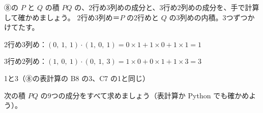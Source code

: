 \begin{reidai}[3×3 の積]
⑧の $P$ と $Q$ の積 $PQ$ の、2行め3列めの成分と、3行め2列めの成分を、手で計算して確かめましょう。
\kangaekata 2行め3列め＝$P$ の2行めと $Q$ の3列めの内積。3つずつかけてたす。\par
\shiki\kviids{}\zw{} 2行め3列め：$(0,\ 1,\ 1)\cdot(1,\ 0,\ 1)=0\times1+1\times0+1\times1=1$\par
\kviida 3行め2列め：$(1,\ 0,\ 1)\cdot(0,\ 1,\ 3)=1\times0+0\times1+1\times3=3$\par
\kotae\kviids{}\zw{} 1と3（⑧の表計算の B8 の3、C7 の1と同じ）
\end{reidai}

\begin{jibun}
次の積 $PQ$ の9つの成分をすべて求めましょう（表計算か Python でも確かめよう）。
\end{jibun}

